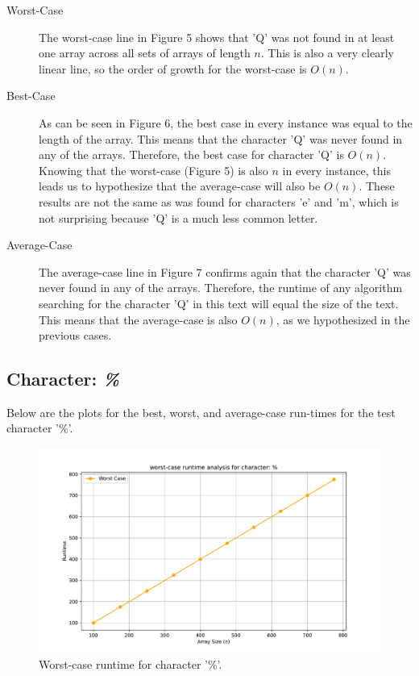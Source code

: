\documentclass{article}
\begin{document}
\begin{description}
    \item[Worst-Case] The worst-case line in Figure 5 shows that 'Q' was not found in at least one array across all sets of arrays of length $n$. This is also a very clearly linear line, so the order of growth for the worst-case is $O(n)$.
    \item[Best-Case] As can be seen in Figure 6, the best case in every instance was equal to the length of the array. This means that the character 'Q' was never found in any of the arrays. Therefore, the best case for character 'Q' is $O(n)$. Knowing that the worst-case (Figure 5) is also $n$ in every instance, this leads us to hypothesize that the average-case will also be $O(n)$. These results are not the same as was found for characters 'e' and 'm', which is not surprising because 'Q' is a much less common letter. 
    \item[Average-Case] The average-case line in Figure 7 confirms again that the character 'Q' was never found in any of the arrays. Therefore, the runtime of any algorithm searching for the character 'Q' in this text will equal the size of the text. This means that the average-case is also $O(n)$, as we hypothesized in the previous cases. 
\end{description}

\subsection{Character: \textit{\%}}
Below are the plots for the best, worst, and average-case run-times for the test character '\%'.

	\begin{figure}[H]
		\centering
		\includegraphics[width=\textwidth]{runtime_analysis_worst_pcnt.pdf}
		\caption{Worst-case runtime for character '\%'.}
	\end{figure}
\end{document}
